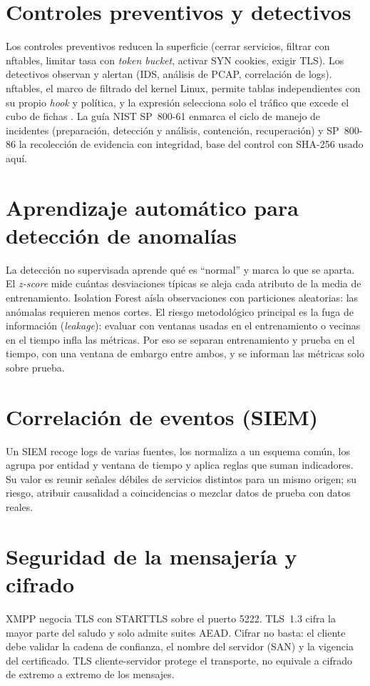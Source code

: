 \section{Controles preventivos y detectivos}
Los controles preventivos reducen la superficie (cerrar servicios, filtrar con nftables, limitar tasa con \emph{token bucket}, activar SYN cookies, exigir TLS). Los detectivos observan y alertan (IDS, análisis de PCAP, correlación de logs). nftables, el marco de filtrado del kernel Linux, permite tablas independientes con su propio \emph{hook} y política, y la expresión  selecciona solo el tráfico que excede el cubo de fichas \cite{nftables}. La guía NIST SP~800-61 \cite{nist80061} enmarca el ciclo de manejo de incidentes (preparación, detección y análisis, contención, recuperación) y SP~800-86 \cite{nist80086} la recolección de evidencia con integridad, base del control con SHA-256 usado aquí.

\section{Aprendizaje automático para detección de anomalías}
La detección no supervisada aprende qué es ``normal'' y marca lo que se aparta. El \emph{z-score} mide cuántas desviaciones típicas se aleja cada atributo de la media de entrenamiento. Isolation Forest \cite{liu2008} aísla observaciones con particiones aleatorias: las anómalas requieren menos cortes. El riesgo metodológico principal es la fuga de información (\emph{leakage}): evaluar con ventanas usadas en el entrenamiento o vecinas en el tiempo infla las métricas. Por eso se separan entrenamiento y prueba en el tiempo, con una ventana de embargo entre ambos, y se informan las métricas solo sobre prueba.

\section{Correlación de eventos (SIEM)}
Un SIEM recoge logs de varias fuentes, los normaliza a un esquema común, los agrupa por entidad y ventana de tiempo y aplica reglas que suman indicadores. Su valor es reunir señales débiles de servicios distintos para un mismo origen; su riesgo, atribuir causalidad a coincidencias o mezclar datos de prueba con datos reales.

\section{Seguridad de la mensajería y cifrado}
XMPP \cite{rfc6120} negocia TLS con STARTTLS sobre el puerto 5222. TLS~1.3 \cite{rfc8446} cifra la mayor parte del saludo y solo admite suites AEAD. Cifrar no basta: el cliente debe validar la cadena de confianza, el nombre del servidor (SAN) y la vigencia del certificado. TLS cliente-servidor protege el transporte, no equivale a cifrado de extremo a extremo de los mensajes.

